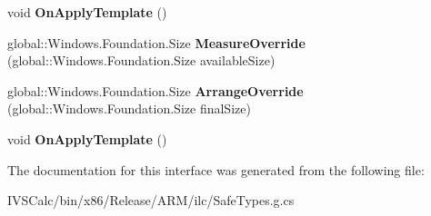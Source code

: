 \begin{DoxyCompactItemize}
void {\bfseries On\+Apply\+Template} ()
\item 
\mbox{\label{interface_windows_1_1_u_i_1_1_xaml_1_1_i_framework_element_overrides_aeda95cec8a5d4e5c11ee9e9f89d8e4bb}} 
global\+::\+Windows.\+Foundation.\+Size {\bfseries Measure\+Override} (global\+::\+Windows.\+Foundation.\+Size available\+Size)
\item 
\mbox{\label{interface_windows_1_1_u_i_1_1_xaml_1_1_i_framework_element_overrides_a1755b4523f8e37b7d2f6dcecf9a1130d}} 
global\+::\+Windows.\+Foundation.\+Size {\bfseries Arrange\+Override} (global\+::\+Windows.\+Foundation.\+Size final\+Size)
\item 
\mbox{\label{interface_windows_1_1_u_i_1_1_xaml_1_1_i_framework_element_overrides_aff9905818ed4b083633d3faf19ee329b}} 
void {\bfseries On\+Apply\+Template} ()
\end{DoxyCompactItemize}


The documentation for this interface was generated from the following file\+:\begin{DoxyCompactItemize}
\item 
I\+V\+S\+Calc/bin/x86/\+Release/\+A\+R\+M/ilc/Safe\+Types.\+g.\+cs\end{DoxyCompactItemize}
